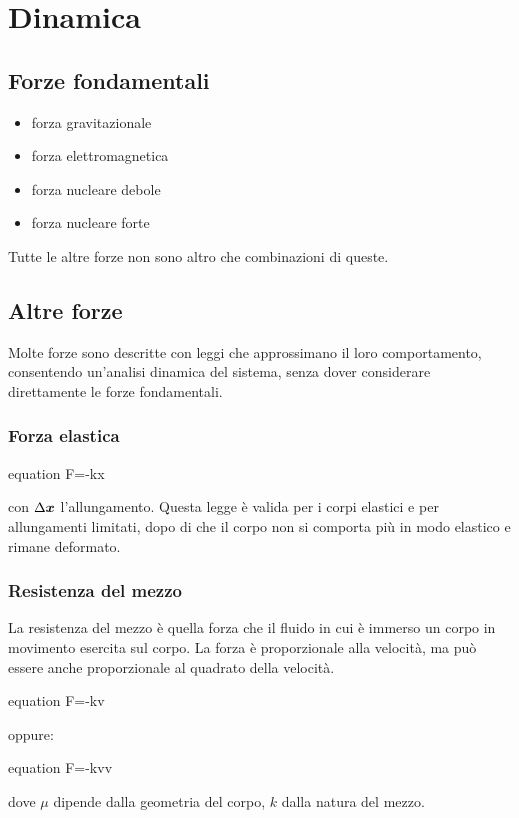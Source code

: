 
\chapter{Dinamica}
\minitoc

\section{Forze fondamentali}
\begin{itemize}
  \item forza gravitazionale
  \item forza elettromagnetica
  \item forza nucleare debole
  \item forza nucleare forte
\end{itemize}
Tutte le altre forze non sono altro che combinazioni di queste.
\section{Altre forze}
Molte forze sono descritte con leggi che approssimano il loro comportamento, consentendo un'analisi dinamica del sistema, senza dover considerare direttamente le forze fondamentali.

\subsection{Forza elastica}
\begin{legge}[Hook]
  \begin{eqimp}{equation}
    \ve F=-k\Delta\ve x
  \end{eqimp}


  con $\Delta\boldsymbol{x}$ l'allungamento. Questa legge è valida per i corpi elastici e per allungamenti limitati, dopo di che il corpo non si comporta più in modo elastico e rimane deformato.
\end{legge}

\subsection{Resistenza del mezzo}
La resistenza del mezzo è quella forza che il fluido in cui è
immerso un corpo in movimento esercita sul corpo. La forza è
proporzionale alla velocità, ma può essere anche proporzionale al
quadrato della velocità.
\begin{eqimp}{equation}
  \ve F=-k\mu \ve v
\end{eqimp}
oppure:
\begin{eqimp}{equation}
  \ve F=-k\mu v\ve v
\end{eqimp}
dove $\mu$ dipende dalla geometria del corpo,
$k$ dalla natura del mezzo.
